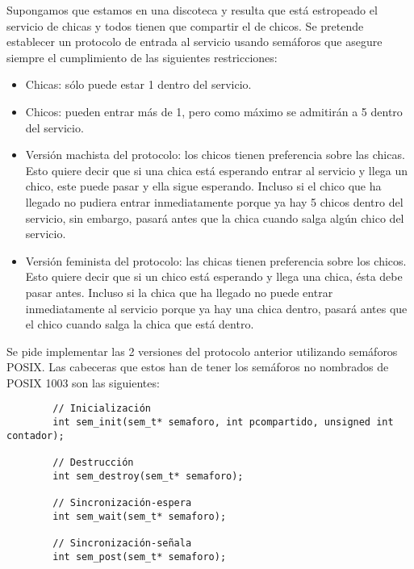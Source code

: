 \begin{ejercicio}
    Supongamos que estamos en una discoteca y resulta que está estropeado el servicio de chicas y todos tienen que compartir el de chicos. Se pretende establecer un protocolo de entrada al servicio usando semáforos que asegure siempre el cumplimiento de las siguientes restricciones:
    \begin{itemize}
        \item Chicas: sólo puede estar 1 dentro del servicio.
        \item Chicos: pueden entrar más de 1, pero como máximo se admitirán a 5 dentro del servicio.
        \item Versión machista del protocolo: los chicos tienen preferencia sobre las chicas. Esto quiere decir que si una chica está esperando entrar al servicio y llega un chico, este puede pasar y ella sigue esperando. Incluso si el chico que ha llegado no pudiera entrar inmediatamente porque ya hay 5 chicos dentro del servicio, sin embargo, pasará antes que la chica cuando salga algún chico del servicio.
        \item Versión feminista del protocolo: las chicas tienen preferencia sobre los chicos. Esto quiere decir que si un chico está esperando y llega una chica, ésta debe pasar antes. Incluso si la chica que ha llegado no puede entrar inmediatamente al servicio porque ya hay una chica dentro, pasará antes que el chico cuando salga la chica que está dentro.
    \end{itemize}

    Se pide implementar las 2 versiones del protocolo anterior utilizando semáforos POSIX\@. Las cabeceras que estos han de tener los semáforos no nombrados de POSIX 1003 son las siguientes:
    \begin{verbatim}
        // Inicialización
        int sem_init(sem_t* semaforo, int pcompartido, unsigned int contador);

        // Destrucción
        int sem_destroy(sem_t* semaforo);

        // Sincronización-espera
        int sem_wait(sem_t* semaforo);

        // Sincronización-señala
        int sem_post(sem_t* semaforo);
    \end{verbatim}


\end{ejercicio}
